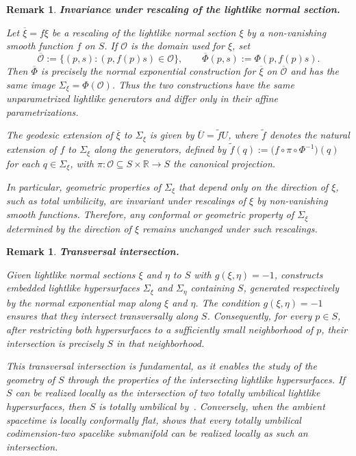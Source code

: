 \documentclass[11pt]{article}
\numberwithin{equation}{section}
\newtheorem{remark}[theorem]{Remark}
\begin{document}
	
\begin{remark}\label{remark:rescaling}
	\textbf{Invariance under rescaling of the lightlike normal section.} \normalfont
	
	Let $\overline{\xi} = f\xi$ be a rescaling of the lightlike normal section $\xi$ by a non-vanishing smooth function $f$ on $S$. If $\mathscr O$ is the domain used for $\xi$, set
	\[
		\overline{\mathscr O}:=\{(p,s):(p,f(p)s)\in\mathscr O\},
		\qquad
		\overline\Phi(p,s):=\Phi(p,f(p)s).
	\]
	Then $\overline\Phi$ is precisely the normal exponential construction for $\overline\xi$ on $\overline{\mathscr O}$ and has the same image $\Sigma_\xi=\Phi(\mathscr O)$. Thus the two constructions have the same unparametrized lightlike generators and differ only in their affine parametrizations.
	
	The geodesic extension of $\overline{\xi}$ to $\Sigma_\xi$ is given by $\overline{U} = \widetilde{f} U$, where $\widetilde{f}$ denotes the natural extension of $f$ to $\Sigma_\xi$ along the generators, defined by $\widetilde{f}(q) := \bigl(f \circ \pi \circ \Phi^{-1}\bigr)(q)$ for each $q \in \Sigma_\xi$, with $\pi\colon\mathscr{O} \subseteq S \times \mathbb{R} \to S$ the canonical projection.
	
	In particular, geometric properties of $\Sigma_\xi$ that depend only on the direction of $\xi$, such as total umbilicity, are invariant under rescalings of $\xi$ by non-vanishing smooth functions. Therefore, any conformal or geometric property of $\Sigma_\xi$ determined by the direction of $\xi$ remains unchanged under such rescalings.
\end{remark}
	\begin{remark}
		\textbf{Transversal intersection.} \normalfont
		
	Given lightlike normal sections $\xi$ and $\eta$ to $S$ with $g(\xi, \eta) = -1$,  constructs embedded lightlike hypersurfaces $\Sigma_\xi$ and $\Sigma_\eta$ containing $S$, generated respectively by the normal exponential map along $\xi$ and $\eta$. The condition $g(\xi, \eta) = -1$ ensures that they intersect transversally along $S$. Consequently, for every $p\in S$, after restricting both hypersurfaces to a sufficiently small neighborhood of $p$, their intersection is precisely $S$ in that neighborhood.
		
		This transversal intersection is fundamental, as it enables the study of the geometry of $S$ through the properties of the intersecting lightlike hypersurfaces. If $S$ can be realized locally as the intersection of two totally umbilical lightlike hypersurfaces, then $S$ is totally umbilical by~. Conversely, when the ambient spacetime is locally conformally flat,  shows that every totally umbilical codimension-two spacelike submanifold can be realized locally as such an intersection.


	\end{remark}
	
\end{document}
